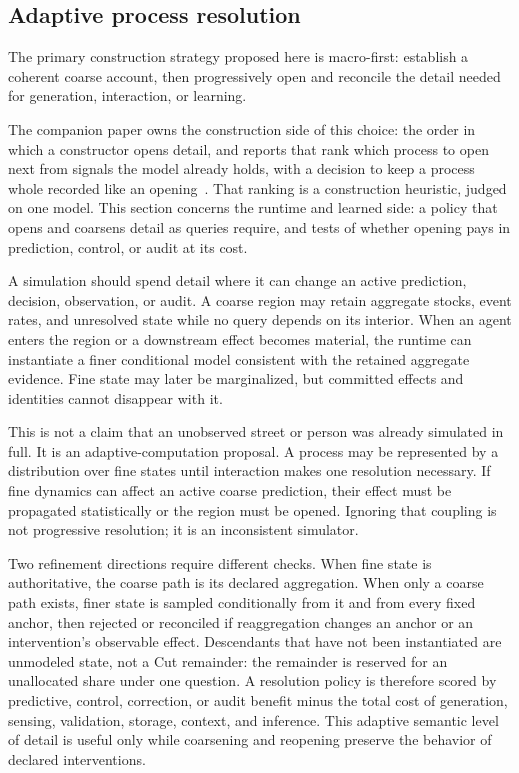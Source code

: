 \documentclass[10pt]{article}
\begin{document}
\subsection{Adaptive process resolution}
\label{sec:resolution}

The primary construction strategy proposed here is macro-first: establish a
coherent coarse account, then progressively open and reconcile the detail
needed for generation, interaction, or learning.

The companion paper owns the construction side of this choice: the order in
which a constructor opens detail, and reports that rank which process to open
next from signals the model already holds, with a decision to keep a process
whole recorded like an opening~\cite{westerbergMeaning2026}. That ranking is a
construction heuristic, judged on one model. This section concerns the runtime
and learned side: a policy that opens and coarsens detail as queries require,
and tests of whether opening pays in prediction, control, or audit at its cost.

A simulation should spend detail where it can change an active prediction,
decision, observation, or audit. A coarse region may retain aggregate stocks,
event rates, and unresolved state while no query depends on its interior. When
an agent enters the region or a downstream effect becomes material, the runtime
can instantiate a finer conditional model consistent with the retained
aggregate evidence. Fine state may later be marginalized, but committed effects
and identities cannot disappear with it.

This is not a claim that an unobserved street or person was already simulated
in full. It is an adaptive-computation proposal. A process may be represented
by a distribution over fine states until interaction makes one resolution
necessary. If fine dynamics can affect an active coarse prediction, their
effect must be propagated statistically or the region must be opened. Ignoring
that coupling is not progressive resolution; it is an inconsistent simulator.

Two refinement directions require different checks. When fine state is
authoritative, the coarse path is its declared aggregation. When only a coarse
path exists, finer state is sampled conditionally from it and from every fixed
anchor, then rejected or reconciled if reaggregation changes an anchor or an
intervention's observable effect. Descendants that have not been instantiated
are unmodeled state, not a Cut remainder: the remainder is reserved for an
unallocated share under one question. A resolution policy is therefore scored
by predictive, control, correction, or audit benefit minus the total cost of
generation, sensing, validation, storage, context, and inference. This adaptive
semantic level of detail is useful only while coarsening and reopening preserve
the behavior of declared interventions.
\end{document}
